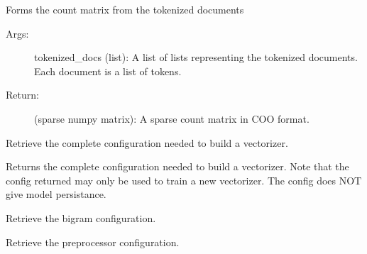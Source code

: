 \documentclass[letterpaper,10pt,english]{sphinxmanual}
\begin{document}
\begin{fulllineitems}
\begin{fulllineitems}
\end{fulllineitems}


\begin{fulllineitems}
\label{\detokenize{KUHERD:KUHERD.HerdVectorizer.HerdVectorizer.form_count_matrix}}
Forms the count matrix from the tokenized documents
\begin{description}
\item[{Args:}] \leavevmode
tokenized\_docs (list): A list of lists representing the tokenized documents. Each document is a list of tokens.

\item[{Return:}] \leavevmode
(sparse numpy matrix): A sparse count matrix in COO format.

\end{description}

\end{fulllineitems}


\begin{fulllineitems}
\label{\detokenize{KUHERD:KUHERD.HerdVectorizer.HerdVectorizer.getConfig}}
Retrieve the complete configuration needed to build a vectorizer.

Returns the complete configuration needed to build a vectorizer. Note that the config returned may only be used
to train a new vectorizer. The config does NOT give model persistance.

\end{fulllineitems}


\begin{fulllineitems}
\label{\detokenize{KUHERD:KUHERD.HerdVectorizer.HerdVectorizer.get_bigram_config}}
Retrieve the bigram configuration.

\end{fulllineitems}


\begin{fulllineitems}
\label{\detokenize{KUHERD:KUHERD.HerdVectorizer.HerdVectorizer.get_preproc_config}}
Retrieve the preprocessor configuration.


\end{fulllineitems}
\end{fulllineitems}
\end{document}
